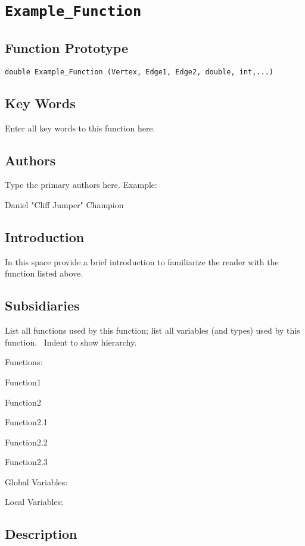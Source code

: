 \documentclass[12pt]{article}%
\begin{document}
\section*{\texttt{Example\_Function}}

\subsection*{Function Prototype}

\texttt{double Example\_Function (Vertex, Edge1, Edge2, double, int,...)}

\subsection*{Key Words}

Enter all key words to this function here.

\subsection*{Authors}

Type the primary authors here. Example:

Daniel "Cliff Jumper" Champion

\subsection*{Introduction}

In this space provide a brief introduction to familiarize the reader with the
function listed above. \ 

\subsection*{Subsidiaries}

List all functions used by this function; list all variables (and types) used
by this function. \ Indent to show hierarchy.

Functions:

\qquad Function1

\qquad Function2

\qquad\qquad Function2.1

\qquad\qquad Function2.2

\qquad\qquad\qquad Function2.3

Global Variables:

Local Variables:

\subsection*{Description}
\end{document}

